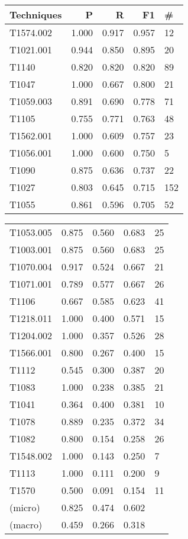 \begin{tabular}[t]{lrrrl|}
    \toprule
    Techniques & P     & R     & F1    & \#  \\
    \midrule
    T1574.002  & 1.000 & 0.917 & 0.957 & 12  \\
    T1021.001  & 0.944 & 0.850 & 0.895 & 20  \\
    T1140      & 0.820 & 0.820 & 0.820 & 89  \\
    T1047      & 1.000 & 0.667 & 0.800 & 21  \\
    T1059.003  & 0.891 & 0.690 & 0.778 & 71  \\
    T1105      & 0.755 & 0.771 & 0.763 & 48  \\
    T1562.001  & 1.000 & 0.609 & 0.757 & 23  \\
    T1056.001  & 1.000 & 0.600 & 0.750 & 5   \\
    T1090      & 0.875 & 0.636 & 0.737 & 22  \\
    T1027      & 0.803 & 0.645 & 0.715 & 152 \\
    T1055      & 0.861 & 0.596 & 0.705 & 52  \\
    \end{tabular}
\begin{tabular}[t]{lrrrl}
    \toprule
    T1053.005  & 0.875 & 0.560 & 0.683 & 25  \\
    T1003.001  & 0.875 & 0.560 & 0.683 & 25  \\
    T1070.004  & 0.917 & 0.524 & 0.667 & 21  \\
    T1071.001  & 0.789 & 0.577 & 0.667 & 26  \\
    T1106      & 0.667 & 0.585 & 0.623 & 41  \\
    T1218.011  & 1.000 & 0.400 & 0.571 & 15  \\
    T1204.002  & 1.000 & 0.357 & 0.526 & 28  \\
    T1566.001  & 0.800 & 0.267 & 0.400 & 15  \\
    T1112      & 0.545 & 0.300 & 0.387 & 20  \\
    T1083      & 1.000 & 0.238 & 0.385 & 21  \\
    T1041      & 0.364 & 0.400 & 0.381 & 10  \\
    T1078      & 0.889 & 0.235 & 0.372 & 34  \\
    T1082      & 0.800 & 0.154 & 0.258 & 26  \\
    T1548.002  & 1.000 & 0.143 & 0.250 & 7   \\
    T1113      & 1.000 & 0.111 & 0.200 & 9   \\
    T1570      & 0.500 & 0.091 & 0.154 & 11  \\
    \midrule
    (micro)    & 0.825 & 0.474 & 0.602 &     \\
    (macro)    & 0.459 & 0.266 & 0.318 &     \\
    \bottomrule
\end{tabular}
